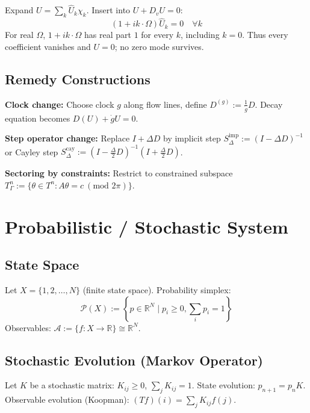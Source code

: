 \documentclass[12pt, oneside]{article}
\begin{document}
Expand $U = \sum_k \widehat{U}_k \chi_k$. Insert into $U + D_v U = 0$:
\begin{equation}
(1 + i k \cdot \Omega) \widehat{U}_k = 0 \quad \forall k
\end{equation}
For real $\Omega$, $1+i k\cdot\Omega$ has real part $1$ for every $k$, including $k=0$. Thus every coefficient vanishes and $U=0$; no zero mode survives.

\subsection{Remedy Constructions}

\textbf{Clock change:} Choose clock $g$ along flow lines, define $D^{(g)} := \frac{1}{\dot{g}} D$. Decay equation becomes $D(U) + \dot{g} U = 0$.

\textbf{Step operator change:} Replace $I + \Delta D$ by implicit step $S_{\Delta}^{\text{imp}} := (I - \Delta D)^{-1}$ or Cayley step $S_{\Delta}^{\text{cay}} := (I - \frac{\Delta}{2} D)^{-1} (I + \frac{\Delta}{2} D)$.

\textbf{Sectoring by constraints:} Restrict to constrained subspace $T_\Gamma^n := \{\theta \in T^n : A\theta = c \ (\text{mod } 2\pi)\}$.

\section{Probabilistic / Stochastic System}

\subsection{State Space}

Let $X = \{1,2,\ldots,N\}$ (finite state space). Probability simplex:
\begin{equation}
\mathcal{P}(X) := \left\{ p \in \mathbb{R}^N \mid p_i \geq 0, \sum_i p_i = 1 \right\}
\end{equation}
Observables: $\mathcal{A} := \{ f: X \rightarrow \mathbb{R} \} \cong \mathbb{R}^N$.

\subsection{Stochastic Evolution (Markov Operator)}

Let $K$ be a stochastic matrix: $K_{ij} \geq 0$, $\sum_j K_{ij} = 1$. State evolution: $p_{n+1} = p_n K$. Observable evolution (Koopman): $(Tf)(i) = \sum_j K_{ij} f(j)$.
\end{document}
